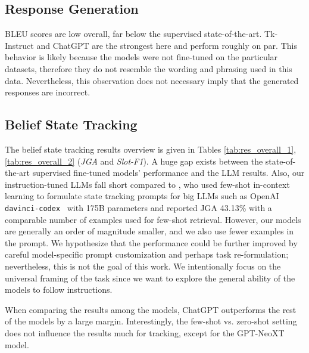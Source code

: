 \subsection{Response Generation}
BLEU scores are low overall, far below the supervised state-of-the-art.
Tk-Instruct and ChatGPT are the strongest here and perform roughly on par.
This behavior is likely because the models were not fine-tuned on the particular datasets, therefore they do not resemble the wording and phrasing used in this data.
Nevertheless, this observation does not necessary imply that the generated responses are incorrect.


\subsection{Belief State Tracking}
\label{subsec:dst}
The belief state tracking results overview is given in Tables \ref{tab:res_overall_1},\ref{tab:res_overall_2} (\emph{JGA} and \emph{Slot-F1}).
A huge gap exists between the state-of-the-art supervised fine-tuned models' performance and the LLM results.
Also, our instruction-tuned LLMs fall short compared to \citet{hu-etal-2022-context}, who used few-shot in-context learning to formulate state tracking prompts for big LLMs such as OpenAI \texttt{davinci-codex}~\citep{chen2021evaluating} with 175B parameters and reported JGA 43.13\% with a comparable number of examples used for few-shot retrieval.
However, our models are generally an order of magnitude smaller, and we also use fewer examples in the prompt.
We hypothesize that the performance could be further improved by careful model-specific prompt customization and perhaps task re-formulation; nevertheless, this is not the goal of this work.
We intentionally focus on the universal framing of the task since we want to explore the general ability of the models to follow instructions.

When comparing the results among the models, ChatGPT outperforms the rest of the models by a large margin. 
Interestingly, the few-shot vs. zero-shot setting does not influence the results much for tracking, except for the GPT-NeoXT model.

